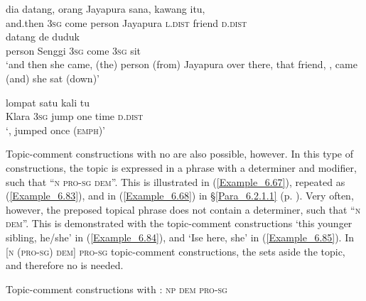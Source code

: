 \ea
\label{Example_6.81}
 {dia} {{datang,}} {{orang}} {{Jayapura}} {sana,} {kawang} {itu,}\\ %
 {and.then}  \textsc{3sg}  {come}  {person}  {Jayapura}  \textsc{l.dist}  friend  \textsc{d.dist}\\
\gll  {}  {} {} \textup{\textbar} {}    {datang}  {de}  {duduk}\\
 person  {Senggi}  {} {} {} \textsc{3sg}  {come}  {\textsc{3sg}}  {sit}\\

 ‘and then she came, (the) person (from) Jayapura over there, that friend, ,  came (and) she sat (down)’ \textstyleExampleSource{[080917-008-NP.0107]}
\z

\ea
\label{Example_6.82}
 {} \textup{\textbar} {} {} {lompat} {satu} {kali} {tu}\\ %
 Klara  {} {} {} \textsc{3sg}  jump  one  time  \textsc{d.dist}\\

\glt
‘,  jumped once (\textsc{emph})’ \textstyleExampleSource{[081025-006-Cv.0216]}
\z


Topic-comment constructions with no  are also possible, however. In this type of constructions, the topic is expressed in a  phrase with a  determiner and  modifier, such that ``\textsc{n pro-sg dem}''. This is illustrated in (\ref{Example_6.67}), repeated as (\ref{Example_6.83}), and in (\ref{Example_6.68}) in §\ref{Para_6.2.1.1} (p. \pageref{Example_6.68}). Very often, however, the preposed topical  phrase does not contain a  determiner, such that ``\textsc{n dem}''. This is demonstrated with the topic-comment constructions  ‘this younger sibling, he/she’ in (\ref{Example_6.84}), and  ‘Ise here, she’ in (\ref{Example_6.85}). In [\textsc{n (pro-sg) dem]} \textsc{pro-sg} topic-comment constructions, the  sets aside the topic, and therefore no  is needed.



\begin{styleExampleTitle}
Topic-comment constructions with : \textsc{np dem} \textsc{pro-sg}
\end{styleExampleTitle}


